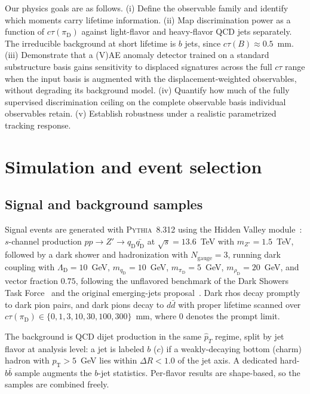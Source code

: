 \documentclass[a4paper,11pt]{article}
\newcommand{\ctau}{c\tau}
\newcommand{\pid}{\pi_{\mathrm{D}}}
\newcommand{\qD}{q_{\mathrm{D}}}
\newcommand{\dR}{\Delta R}
\newcommand{\pT}{p_{\mathrm{T}}}
\begin{document}
Our physics goals are as follows.
(i) Define the observable family and identify which moments carry
lifetime information.
(ii) Map discrimination power as a function of $\ctau(\pid)$ against
light-flavor and heavy-flavor QCD jets separately. The irreducible
background at short lifetime is $b$ jets, since
$\ctau(B) \approx 0.5$~mm.
(iii) Demonstrate that a (V)AE anomaly detector trained on a standard
substructure basis gains sensitivity to displaced signatures across the
full $\ctau$ range when the input basis is augmented with the
displacement-weighted observables, without degrading its background
model.
(iv) Quantify how much of the fully supervised discrimination ceiling
on the complete observable basis individual observables retain.
(v) Establish robustness under a realistic parametrized tracking
response.

\section{Simulation and event selection}
\label{sec:simulation}

\subsection{Signal and background samples}

Signal events are generated with \textsc{Pythia}~8.312
\cite{Bierlich:2022pfr} using the Hidden Valley
module~\cite{Carloni:2010tw}: $s$-channel production
$pp \to Z' \to \qD\bar{\qD}$ at $\sqrt{s} = 13.6$~TeV with
$m_{Z'} = 1.5$~TeV, followed by a dark shower and hadronization with
$N_{\mathrm{gauge}} = 3$, running dark coupling with
$\Lambda_{\mathrm{D}} = 10$~GeV, $m_{\qD} = 10$~GeV,
$m_{\pid} = 5$~GeV, $m_{\rho_{\mathrm{D}}} = 20$~GeV, and vector
fraction $0.75$, following the unflavored benchmark of the Dark Showers
Task Force~\cite{Albouy:2022cin} and the original emerging-jets
proposal~\cite{Schwaller:2015gea}. Dark rhos decay promptly to dark
pion pairs, and dark pions decay to $d\bar d$ with proper lifetime scanned
over $\ctau(\pid) \in \{0, 1, 3, 10, 30, 100, 300\}$~mm, where $0$
denotes the prompt limit.

The background is QCD dijet production in the same $\hat p_T$ regime,
split by jet flavor at analysis level: a jet is labeled $b$ ($c$) if a
weakly-decaying bottom (charm) hadron with $\pT > 5$~GeV lies within
$\dR < 1.0$ of the jet axis. A dedicated hard-$b\bar b$ sample
augments the $b$-jet statistics. Per-flavor results are shape-based, so
the samples are combined freely.
\end{document}
